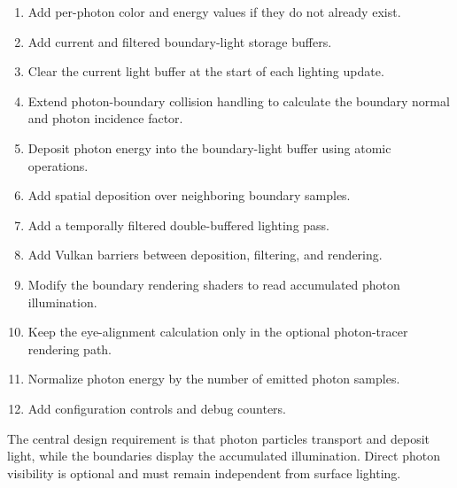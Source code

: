 \documentclass[11pt]{article}
\begin{document}
\begin{enumerate}
    \item Add per-photon color and energy values if they do not already exist.
    \item Add current and filtered boundary-light storage buffers.
    \item Clear the current light buffer at the start of each lighting update.
    \item Extend photon-boundary collision handling to calculate the boundary
    normal and photon incidence factor.
    \item Deposit photon energy into the boundary-light buffer using atomic
    operations.
    \item Add spatial deposition over neighboring boundary samples.
    \item Add a temporally filtered double-buffered lighting pass.
    \item Add Vulkan barriers between deposition, filtering, and rendering.
    \item Modify the boundary rendering shaders to read accumulated photon
    illumination.
    \item Keep the eye-alignment calculation only in the optional photon-tracer
    rendering path.
    \item Normalize photon energy by the number of emitted photon samples.
    \item Add configuration controls and debug counters.
\end{enumerate}

The central design requirement is that photon particles transport and deposit
light, while the boundaries display the accumulated illumination. Direct
photon visibility is optional and must remain independent from surface lighting.
\end{document}
